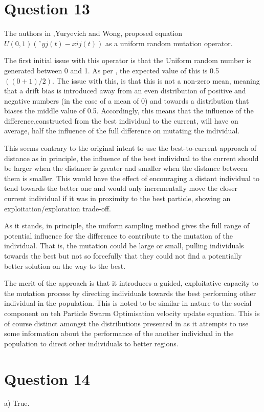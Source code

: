 \documentclass[12pt]{article}
\begin{document}
\section{Question 13}
The authors in \cite{667339},Yuryevich and Wong, proposed equation 
    $U(0, 1)(ˆyj(t) − xij(t))$ as a uniform random mutation operator.

    The first initial issue with this operator is that the Uniform random number is generated between 0 and 1. As per \cite{wolframUniform}, the expected value of this is 0.5 $((0+1)/2)$. The issue with this, is that this is not a non-zero mean, meaning that a drift bias is introduced away from an even distribution of positive and negative numbers (in the case of a mean of 0) and towards a distribution that biases the middle value of 0.5. Accordingly, this means that the influence of the difference,constructed from the best individual to the current, will have on average, half the influence of the full difference on mutating the individual.

    This seems contrary to the original intent to use the best-to-current approach of distance as in principle, the influence of the best individual to the current should be larger when the distance is greater and smaller when the distance between them is smaller. This would have the effect of encouraging a distant individual to tend towards the better one and would only incrementally move the closer current individual if it was in proximity to the best particle, showing an exploitation/exploration trade-off.

    As it stands, in principle, the uniform sampling method gives the full range of potential influence for the difference to contribute to the mutation of the individual. That is, the mutation could be large or small, pulling individuals towards the best but not so forcefully that they could not find a potentially better solution on the way to the best.

    The merit of the approach is that it introduces a guided, exploitative capacity to the mutation process by directing individuals towards the best performing other individual in the population. This is noted to be similar in nature to the social component on teh Particle Swarm Optimisation velocity update equation. This is of course distinct amongst the distributions presented in \cite{engelCI02} as it attempts to use some information about the performance of the another individual in the  population to direct other individuals to better regions.
\section{Question 14}
a) True.
\end{document}
